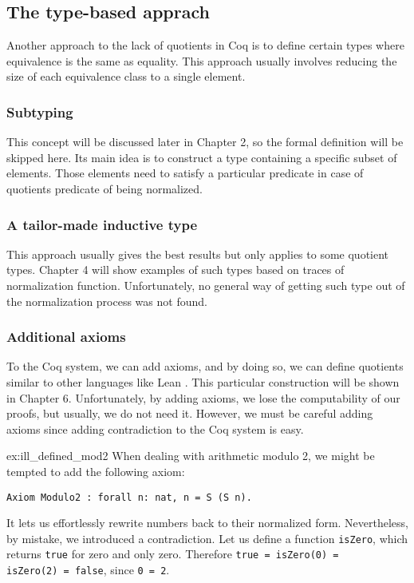 \subsection{The type-based apprach}
Another approach to the lack of quotients in Coq is to define certain types 
where equivalence is the same as equality. This approach usually involves reducing the size of each equivalence class to a single element.

\subsubsection{Subtyping}
This concept will be discussed later in Chapter 2, so the formal definition will be skipped here. Its main idea is to construct a type containing a specific subset of elements. Those elements need to satisfy a particular predicate in case of quotients predicate of being normalized.

\subsubsection{A tailor-made inductive type}
This approach usually gives the best results but only applies to some quotient types. Chapter 4 will show examples of such types based on traces of normalization function. Unfortunately, no general way of getting such type out of the normalization process was not found.

\subsubsection{Additional axioms}
To the Coq system, we can add axioms, and by doing so, we can define quotients similar to other languages like Lean \cite{lean4}. This particular construction will be shown in Chapter 6. Unfortunately, by adding axioms, we lose the computability of our proofs, but usually, we do not need it. However, we must be careful adding axioms since adding contradiction to the Coq system is easy.
\begin{example}{}{ex:ill_defined_mod2}
When dealing with arithmetic modulo 2, we might be tempted to add the following axiom:
\begin{verbatim}
Axiom Modulo2 : forall n: nat, n = S (S n).
\end{verbatim}
It lets us effortlessly rewrite numbers back to their normalized form. Nevertheless, by mistake, we introduced a contradiction. Let us define a function \texttt{isZero}, which returns \texttt{true} for zero and only zero. Therefore \texttt{true = isZero(0) = } \\ \texttt{isZero(2) = false}, since \texttt{0 = 2}.
\end{example}

